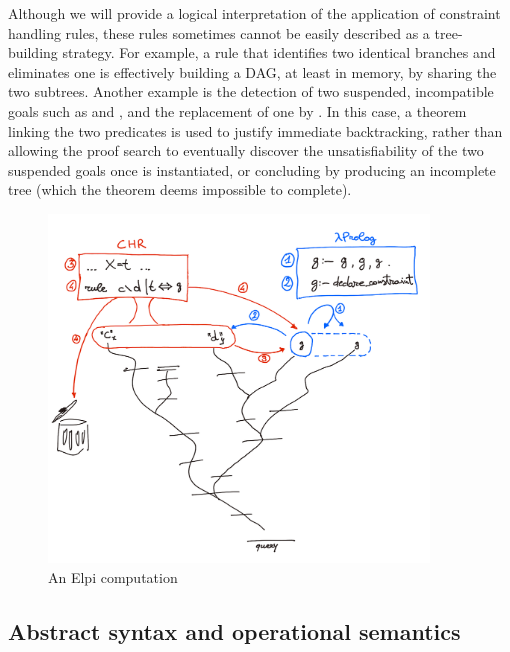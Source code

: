 \documentclass{these-ISSS}
\begin{document}
Although we will provide a logical interpretation of the application of
constraint handling rules, these rules sometimes cannot be easily described as a
tree-building strategy. For example, a rule that identifies two identical
branches and eliminates one is effectively building a DAG, at least in memory, by
sharing the two subtrees. Another example is the detection of two suspended,
incompatible goals such as  and , and the replacement
of one by . In this case, a theorem linking the two predicates is
used to justify immediate backtracking, rather than allowing the proof search to
eventually discover the unsatisfiability of the two suspended goals once
 is instantiated, or concluding by producing an incomplete tree (which the
theorem deems impossible to complete).

\begin{figure}[p]
  \begin{center}
    \includegraphics[width=0.9\textwidth]{chr.png}
    \caption{\label{fig:chr}An Elpi computation}
  \end{center}
\end{figure}

\newpage
\subsection{Abstract syntax and operational semantics}\label{sec:sem}

\end{document}
